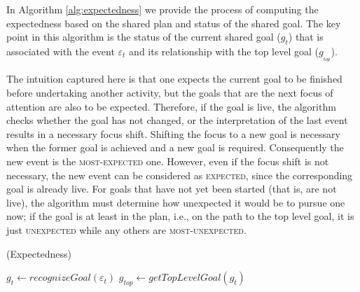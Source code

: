 \documentclass{aamas2016_extendedabstract}
\begin{document}
In Algorithm \ref{alg:expectedness} we provide the process of computing the
expectedness based on the shared plan and status of the shared goal. The key
point in this algorithm is the status of the current shared goal
($\mathit{g}_{t}$) that is associated with the event $\varepsilon_t$ and its
relationship with the top level goal ($\mathit{g}_{_{top}}$).

The intuition captured here is that one expects the current goal to be finished
before undertaking another activity, but the goals that are the next focus of
attention are also to be expected. Therefore, if the goal is live, the algorithm
checks whether the goal has not changed, or the interpretation of the last
event results in a necessary focus shift. Shifting the focus to a new goal is
necessary when the former goal is achieved and a new goal is required.
Consequently the new event is the \textsc{most-expected} one. However, even if
the focus shift is not necessary, the new event can be considered as
\textsc{expected}, since the corresponding goal is already live. For goals that
have not yet been started (that is, are not live), the algorithm must determine
how unexpected it would be to pursue one now; if the goal is at least in the
plan, i.e., on the path to the top level goal, it is just \textsc{unexpected}
while any others are \textsc{most-unexpected}.

\vspace*{-2mm}
\begin{algorithm}
	\caption{(Expectedness)}
	\label{alg:expectedness}
	\begin{algorithmic}[1]
			\State $\mathit{g}_{t} \gets \textit{recognizeGoal}{(\varepsilon_t)}$
			\State $\mathit{g}_{top} \gets \textit{getTopLevelGoal}{(\mathit{g}_{t})}$
				\State {}
				\Else
					\State {}
				\EndIf
			\Else
					\State {}
				\Else
					\State {}
				\EndIf
			\EndIf
		\EndFunction
	\end{algorithmic}
\end{algorithm}
\end{document}
